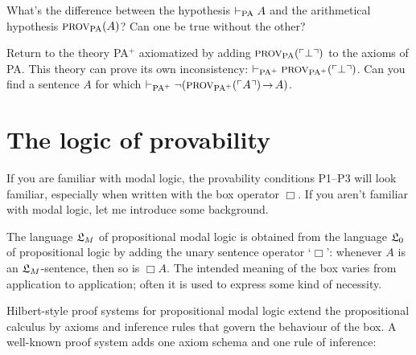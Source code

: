 

\begin{exercise}
  What's the difference between the hypothesis $\vdash_{\mathrm{PA}} A$ and
  the arithmetical hypothesis $\smallcaps{Prov}_{\mathrm{PA}}(A)$?
  Can one be true without the other? %
\end{exercise}

\begin{exercise}
  Return to the theory PA$^+$ axiomatized by adding
  $\smallcaps{Prov}_{\mathrm{PA}}(\gn{\bot})$ to the axioms of PA.
  This theory can prove its own inconsistency:
  $\proves_{\mathrm{PA}^+} \smallcaps{Prov}_{\mathrm{PA}^+}(\gn{\bot})$.
  Can you find a sentence $A$ for which $\proves_{\mathrm{PA}^+} \neg(\smallcaps{Prov}_{\mathrm{PA}^+}(\gn{A}) \to A)$.
\end{exercise}



\section{The logic of provability}

If you are familiar with modal logic,
the provability conditions P1--P3 will look familiar,
especially when written with the box operator $\Box$.
If you aren't familiar with modal logic,
let me introduce some background.

The language $\mathfrak{L}_M$ of propositional modal logic
is obtained from the language $\mathfrak{L}_0$ of propositional logic
by adding the unary sentence operator `$\Box$':
whenever $A$ is an $\mathfrak{L}_M$-sentence,
then so is $\Box A$.
The intended meaning of the box varies from application to application;
often
it is used to express some kind of necessity.

Hilbert-style proof systems for propositional modal logic
extend the propositional calculus by axioms and inference rules
that govern the behaviour of the box.
A well-known proof system adds one axiom schema and one rule of inference:

